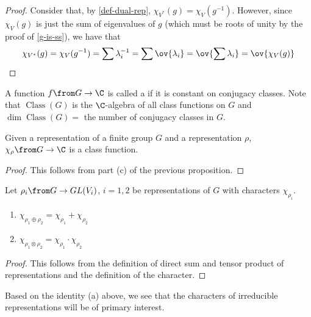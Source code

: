 \documentclass[11pt,leqno,oneside]{amsbook}
\numberwithin{thm}{section}
\begin{document}
\begin{proof}
  Consider that, by \ref{def-dual-rep}, \(\chi_{V^*}(g) =
  \chi_V(g^{-1})\). However, since \(\chi_V(g)\) is just the sum of
  eigenvalues of \(g\) (which must be roots of unity by the proof of \ref{g-is-ss}), we have that \[
    \chi_{V^*}(g) = \chi_V(g^{-1}) = \sum \lambda_i^{-1} = \sum
    \ov{\lambda_i} = \ov{\sum \lambda_i} = \ov{\chi_V(g)}
  \]
\end{proof}
\begin{defn}
  A function \(f \from G \to \C\) is called a 
  if it is constant on conjugacy classes. Note that
  \(\operatorname{Class}(G)\) is the \(\C\)-algebra of all class
  functions on \(G\) and \(\dim \operatorname{Class}(G) =\) the number
  of conjugacy classes in \(G\).
\end{defn}
\begin{prop}
  Given a representation of a finite group \(G\) and a representation
  \(\rho\), \(\chi_\rho \from G \to \C\)  is a class function. 
\end{prop}
\begin{proof}
  This follows from part (c) of the previous proposition.
\end{proof}
\begin{prop}
  Let \(\rho_i \from G \to GL(V_i)\), \(i = 1,2\) be representations
  of \(G\) with characters \(\chi_{\rho_i}\).
  \begin{enumerate}
  \item \(\chi_{\rho_1 \oplus \rho_2} = \chi_{\rho_1} + \chi_{\rho_2}\)
  \item \(\chi_{\rho_1 \otimes \rho_2} = \chi_{\rho_1} \cdot \chi_{\rho_2}\)
  \end{enumerate}
\end{prop}
\begin{proof}
  This follows from the definition of direct sum and tensor product of
  representations and the definition of the character.
\end{proof}
Based on the identity (a) above, we see that the characters of
irreducible representations will be of primary interest.
\end{document}
